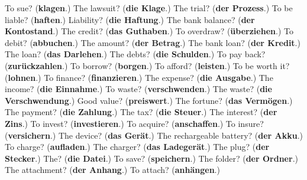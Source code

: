 \begin{tcolorbox}[breakable,colback=teal!4,colframe=teal!35!black,title={Before you move on}]
To sue? (\textbf{klagen}.) The lawsuit? (\textbf{die Klage}.) The trial? (\textbf{der Prozess}.) To be liable? (\textbf{haften}.) Liability? (\textbf{die Haftung}.) The bank balance? (\textbf{der Kontostand}.) The credit? (\textbf{das Guthaben}.) To overdraw? (\textbf{überziehen}.) To debit? (\textbf{abbuchen}.) The amount? (\textbf{der Betrag}.) The bank loan? (\textbf{der Kredit}.) The loan? (\textbf{das Darlehen}.) The debts? (\textbf{die Schulden}.) To pay back? (\textbf{zurückzahlen}.) To borrow? (\textbf{borgen}.) To afford? (\textbf{leisten}.) To be worth it? (\textbf{lohnen}.) To finance? (\textbf{finanzieren}.) The expense? (\textbf{die Ausgabe}.) The income? (\textbf{die Einnahme}.) To waste? (\textbf{verschwenden}.) The waste? (\textbf{die Verschwendung}.) Good value? (\textbf{preiswert}.) The fortune? (\textbf{das Vermögen}.) The payment? (\textbf{die Zahlung}.) The tax? (\textbf{die Steuer}.) The interest? (\textbf{der Zins}.) To invest? (\textbf{investieren}.) To acquire? (\textbf{anschaffen}.) To insure? (\textbf{versichern}.) The device? (\textbf{das Gerät}.) The rechargeable battery? (\textbf{der Akku}.) To charge? (\textbf{aufladen}.) The charger? (\textbf{das Ladegerät}.) The plug? (\textbf{der Stecker}.) The? (\textbf{die Datei}.) To save? (\textbf{speichern}.) The folder? (\textbf{der Ordner}.) The attachment? (\textbf{der Anhang}.) To attach? (\textbf{anhängen}.)
\end{tcolorbox}
